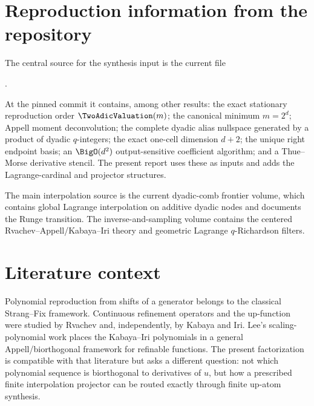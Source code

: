 \documentclass[11pt,oneside]{article}
\numberwithin{equation}{section}
\theoremstyle{definition}
\theoremstyle{remark}
\begin{document}
\section{Reproduction information from the repository}
\label{app:repo}
The central source for the synthesis input is the current file
\begin{center}
\small
{}.
\end{center}
At the pinned commit it contains, among other results: the exact stationary
reproduction order \(\TwoAdicValuation(m)\); the canonical minimum \(m=2^d\); Appell moment
deconvolution; the complete dyadic alias nullspace generated by a product of
dyadic \(q\)-integers; the exact one-cell dimension \(d+2\); the unique right
endpoint basis; an \(\BigO(d^2)\) output-sensitive coefficient algorithm; and a
Thue--Morse derivative stencil.  The present report uses these as inputs and adds
the Lagrange-cardinal and projector structures.

The main interpolation source is the current dyadic-comb frontier volume, which
contains global Lagrange interpolation on additive dyadic nodes and documents the
Runge transition.  The inverse-and-sampling volume contains the centered
Rvachev--Appell/Kabaya--Iri theory and geometric Lagrange \(q\)-Richardson filters.

\section{Literature context}
Polynomial reproduction from shifts of a generator belongs to the classical
Strang--Fix framework.  Continuous refinement operators and the up-function were
studied by Rvachev and, independently, by Kabaya and Iri.  Lee's scaling-polynomial
work places the Kabaya--Iri polynomials in a general Appell/biorthogonal framework
for refinable functions.  The present factorization is compatible with that
literature but asks a different question: not which polynomial sequence is
biorthogonal to derivatives of \(u\), but how a prescribed finite interpolation
projector can be routed exactly through finite up-atom synthesis.
\end{document}
